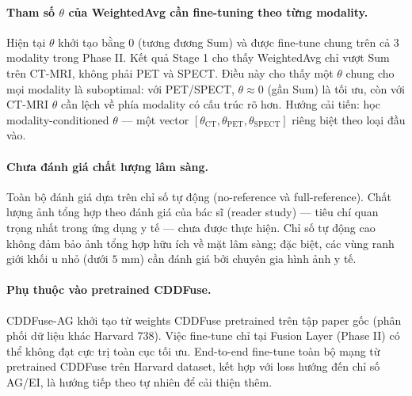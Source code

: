 \paragraph{Tham số $\theta$ của WeightedAvg cần fine-tuning theo từng modality.}
Hiện tại $\theta$ khởi tạo bằng 0 (tương đương Sum) và được fine-tune chung trên cả 3 modality trong Phase II. Kết quả Stage 1 cho thấy WeightedAvg chỉ vượt Sum trên CT-MRI, không phải PET và SPECT. Điều này cho thấy một $\theta$ chung cho mọi modality là suboptimal: với PET/SPECT, $\theta \approx 0$ (gần Sum) là tối ưu, còn với CT-MRI $\theta$ cần lệch về phía modality có cấu trúc rõ hơn. Hướng cải tiến: học modality-conditioned $\theta$ --- một vector $[\theta_{\text{CT}}, \theta_{\text{PET}}, \theta_{\text{SPECT}}]$ riêng biệt theo loại đầu vào.

\paragraph{Chưa đánh giá chất lượng lâm sàng.}
Toàn bộ đánh giá dựa trên chỉ số tự động (no-reference và full-reference). Chất lượng ảnh tổng hợp theo đánh giá của bác sĩ (reader study) --- tiêu chí quan trọng nhất trong ứng dụng y tế --- chưa được thực hiện. Chỉ số tự động cao không đảm bảo ảnh tổng hợp hữu ích về mặt lâm sàng; đặc biệt, các vùng ranh giới khối u nhỏ (dưới $5$ mm) cần đánh giá bởi chuyên gia hình ảnh y tế.

\paragraph{Phụ thuộc vào pretrained CDDFuse.}
CDDFuse-AG khởi tạo từ weights CDDFuse pretrained trên tập paper gốc (phân phối dữ liệu khác Harvard 738). Việc fine-tune chỉ tại Fusion Layer (Phase II) có thể không đạt cực trị toàn cục tối ưu. End-to-end fine-tune toàn bộ mạng từ pretrained CDDFuse trên Harvard dataset, kết hợp với loss hướng đến chỉ số AG/EI, là hướng tiếp theo tự nhiên để cải thiện thêm.
